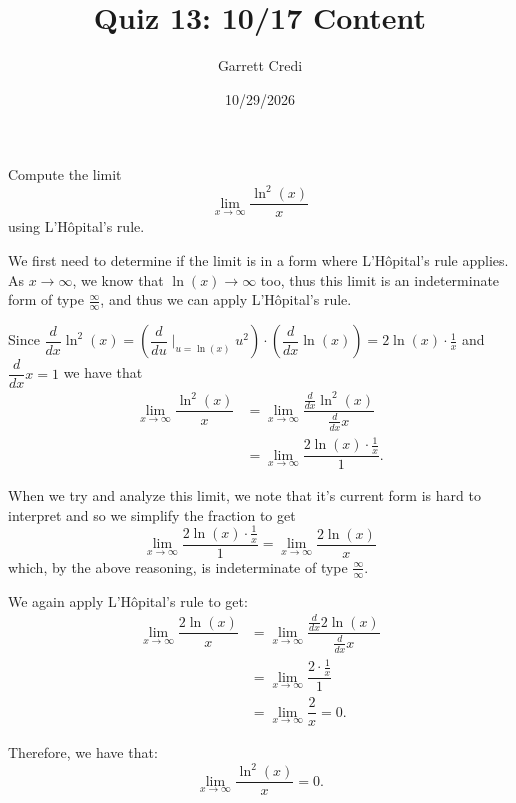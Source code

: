 \documentclass[addpoints,12pt]{exam}
\title{Quiz 13: 10/17 Content}
\author{Garrett Credi}
\date{10/29/2026}
\begin{document}
\maketitle

\newpage

\begin{questions}
  \question[5] Compute the limit
  \begin{equation}
    \lim\limits_{x \rightarrow \infty} \dfrac{\ln^2(x)}{x}
  \end{equation}
  using L'Hôpital's rule.

  \begin{solution}
    We first need to determine if the limit is in a form where L'Hôpital's rule applies.
    As $x \rightarrow \infty$, we know that $\ln(x) \rightarrow \infty$ too,
    thus this limit is an indeterminate form of type $\frac{\infty}{\infty}$,
    and thus we can apply L'Hôpital's rule.

    Since $\dfrac{d}{dx} \ln^2(x) = \left(\dfrac{d}{du}\mid_{u = \ln(x)} u^2 \right) \cdot \left(\dfrac{d}{dx} \ln(x)\right) = 2 \ln(x) \cdot \frac{1}{x}$
    and $\dfrac{d}{dx} x = 1$ we have that
    \begin{align}
      \lim\limits_{x \rightarrow \infty} \dfrac{\ln^2(x)}{x} &= \lim\limits_{x \rightarrow \infty} \dfrac{\frac{d}{dx} \ln^2(x)}{\frac{d}{dx} x} \\
                                                             &= \lim\limits_{x \rightarrow \infty} \dfrac{2 \ln(x) \cdot \frac{1}{x}}{1}.
    \end{align}

    When we try and analyze this limit, we note that it's current form is hard to interpret and so we simplify the fraction to get
    \begin{equation}
      \lim\limits_{x \rightarrow \infty} \dfrac{2\ln(x) \cdot \frac{1}{x}}{1} = \lim\limits_{x \rightarrow \infty} \dfrac{2\ln(x)}{x}
    \end{equation}
    which, by the above reasoning, is indeterminate of type $\frac{\infty}{\infty}$.

    We again apply L'Hôpital's rule to get:
    \begin{align}
      \lim\limits_{x \rightarrow \infty} \dfrac{2\ln(x)}{x} &= \lim\limits_{x \rightarrow \infty} \dfrac{\frac{d}{dx} 2 \ln(x)}{\frac{d}{dx} x} \\
                                                            &= \lim\limits_{x \rightarrow \infty} \dfrac{2 \cdot \frac{1}{x}}{1} \\
                                                            &= \lim\limits_{x \rightarrow \infty} \dfrac{2}{x} = 0.
    \end{align}

    Therefore, we have that:
    \begin{equation}
      \lim\limits_{x \rightarrow \infty} \dfrac{\ln^2(x)}{x} = 0.
    \end{equation}
  \end{solution}
\end{questions}
\end{document}
